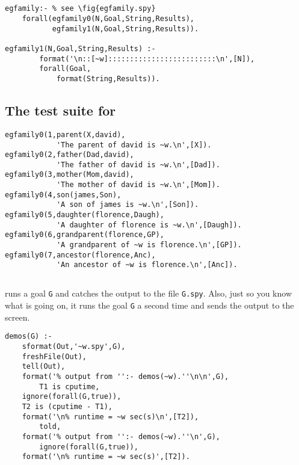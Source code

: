 \documentclass[twocolumn,global]{svjour}
\begin{document}
\subsection{  }
\begin{Verbatim}
egfamily:- % see \fig{egfamily.spy}
    forall(egfamily0(N,Goal,String,Results),
           egfamily1(N,Goal,String,Results)).

egfamily1(N,Goal,String,Results) :-
        format('\n::[~w]:::::::::::::::::::::::::\n',[N]),
        forall(Goal,
            format(String,Results)).
\end{Verbatim}
\subsection{ The test suite for  }\begin{Verbatim}
egfamily0(1,parent(X,david),
            'The parent of david is ~w.\n',[X]).
egfamily0(2,father(Dad,david),
            'The father of david is ~w.\n',[Dad]).
egfamily0(3,mother(Mom,david),
            'The mother of david is ~w.\n',[Mom]).
egfamily0(4,son(james,Son),
            'A son of james is ~w.\n',[Son]).
egfamily0(5,daughter(florence,Daugh),
            'A daughter of florence is ~w.\n',[Daugh]).
egfamily0(6,grandparent(florence,GP),
            'A grandparent of ~w is florence.\n',[GP]).            
egfamily0(7,ancestor(florence,Anc),
            'An ancestor of ~w is florence.\n',[Anc]).
\end{Verbatim}
\subsection{ }

 runs a goal {\tt G} and catches the output to the file
{\tt G.spy}. Also, just so you know what is going on,
it runs the goal {\tt G} a second time and sends the output to the screen. 

\begin{Verbatim}
demos(G) :-
    sformat(Out,'~w.spy',G),
    freshFile(Out),
    tell(Out),
    format('% output from '':- demos(~w).''\n\n',G),
        T1 is cputime,
    ignore(forall(G,true)),
    T2 is (cputime - T1),
    format('\n% runtime = ~w sec(s)\n',[T2]),
        told,
    format('% output from '':- demos(~w).''\n',G),  
        ignore(forall(G,true)),
    format('\n% runtime = ~w sec(s)',[T2]).
\end{Verbatim}
\end{document}
